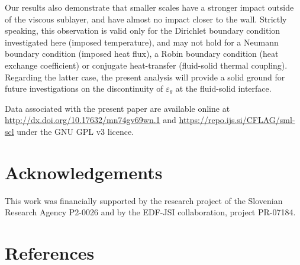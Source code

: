 \documentclass[review]{elsarticle}
\newcommand{\epst}{\varepsilon_\theta}
\begin{document}
Our results also demonstrate that smaller scales have a stronger impact outside of the viscous sublayer, and have almost no impact closer to the wall. Strictly speaking, this observation is valid only for the Dirichlet boundary condition investigated here (imposed temperature), and may not hold for a Neumann boundary condition (imposed heat flux), a Robin boundary condition (heat exchange coefficient) or conjugate heat-transfer (fluid-solid thermal coupling). Regarding the latter case, the present analysis will provide a solid ground for future investigations on the discontinuity of $\epst$ at the fluid-solid interface.

Data associated with the present paper are available online at \url{http://dx.doi.org/10.17632/mn74gv69wn.1} and \url{https://repo.ijs.si/CFLAG/sml-scl} under the GNU GPL v3 licence.

\section*{Acknowledgements}

This work was financially supported by the research project of the Slovenian Research Agency P2-0026 and by the EDF-JSI collaboration, project PR-07184.

\section*{References}


\end{document}
